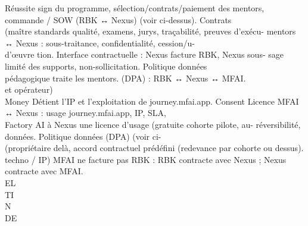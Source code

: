 \documentclass[12pt,landscape,a4paper]{article}
\begin{document}
Réussite          sign du programme, sélection/contrats/paiement des mentors, commande / SOW (RBK ↔ Nexus) (voir ci-dessus). Contrats\\
(maître           standards qualité, examens, jurys, traçabilité, preuves d’exécu- mentors ↔ Nexus : sous-traitance, confidentialité, cession/u-\\
d’œuvre           tion. Interface contractuelle : Nexus facture RBK, Nexus sous- sage limité des supports, non-sollicitation. Politique données\\
pédagogique       traite les mentors.                                              (DPA) : RBK ↔ Nexus ↔ MFAI.\\
et opérateur)\\
\vspace{0.5em}
Money             Détient l’IP et l’exploitation de journey.mfai.app. Consent Licence MFAI ↔ Nexus : usage journey.mfai.app, IP, SLA,\\
Factory AI        à Nexus une licence d’usage (gratuite cohorte pilote, au- réversibilité, données. Politique données (DPA) (voir ci-\\
(propriétaire     delà, accord contractuel prédéfini (redevance par cohorte ou dessus).\\
techno / IP)      MFAI ne facture pas RBK : RBK contracte avec Nexus ; Nexus\\
contracte avec MFAI.\\
\vspace{0.5em}
\vspace{0.5em}
\vspace{0.5em}
\vspace{0.5em}
EL\\
TI\\
N\\
DE\\
\end{document}
